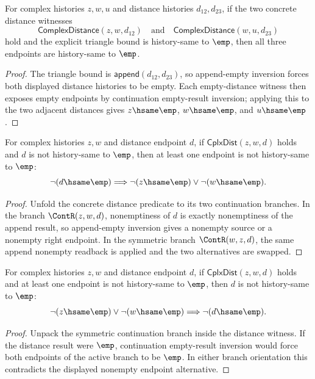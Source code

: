 \begin{theorem}
\label{thm:complex-distance-triangle-bound-empty-endpoints}
For complex histories $z,w,u$ and distance histories $d_{12},d_{23}$, if
the two concrete distance witnesses
$$
\mathsf{ComplexDistance}(z,w,d_{12})
\quad\text{and}\quad
\mathsf{ComplexDistance}(w,u,d_{23})
$$
hold and the explicit triangle bound is history-same to $\emp$, then all
three endpoints are history-same to $\emp$.
\end{theorem}
\begin{proof}
The triangle bound is $\mathsf{append}(d_{12},d_{23})$, so append-empty
inversion forces both displayed distance histories to be empty. Each
empty-distance witness then exposes empty endpoints by continuation
empty-result inversion; applying this to the two adjacent distances gives
$z\hsame\emp$, $w\hsame\emp$, and $u\hsame\emp$.
\end{proof}

\begin{lemma}
\label{thm:cplx-dist-nonempty-distance-endpoint-cases}
For complex histories $z,w$ and distance endpoint $d$, if
$\mathsf{CplxDist}(z,w,d)$ holds and $d$ is not history-same to $\emp$, then
at least one endpoint is not history-same to $\emp$:
$$
\neg(d\hsame\emp)\Longrightarrow \neg(z\hsame\emp)\vee\neg(w\hsame\emp).
$$
\end{lemma}
\begin{proof}
Unfold the concrete distance predicate to its two continuation branches. In
the branch $\ContR(z,w,d)$, nonemptiness of $d$ is exactly nonemptiness of the
append result, so append-empty inversion gives a nonempty source or a nonempty
right endpoint. In the symmetric branch $\ContR(w,z,d)$, the same append
nonempty readback is applied and the two alternatives are swapped.
\end{proof}

\begin{lemma}
\label{thm:complex-distance-endpoint-nonempty-distance-nonempty}
For complex histories $z,w$ and distance endpoint $d$, if
$\mathsf{CplxDist}(z,w,d)$ holds and at least one endpoint is not
history-same to $\emp$, then $d$ is not history-same to $\emp$:
$$
\neg(z\hsame\emp)\vee\neg(w\hsame\emp)
\Longrightarrow
\neg(d\hsame\emp).
$$
\end{lemma}
\begin{proof}
Unpack the symmetric continuation branch inside the distance witness. If the
distance result were $\emp$, continuation empty-result inversion would force
both endpoints of the active branch to be $\emp$. In either branch orientation
this contradicts the displayed nonempty endpoint alternative.
\end{proof}

